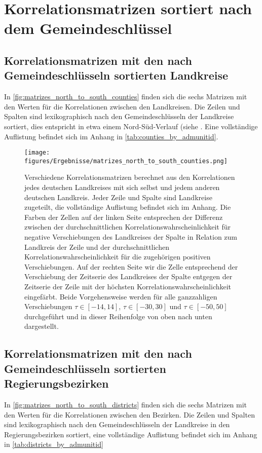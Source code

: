 \section{Korrelationsmatrizen sortiert nach dem Gemeindeschlüssel}
\subsection{Korrelationsmatrizen mit den nach Gemeindeschlüsseln sortierten Landkreise}
In \autoref{fig:matrizes_north_to_south_counties} finden sich die sechs Matrizen mit den Werten für die Korrelationen zwischen den Landkreisen.
Die Zeilen und Spalten sind lexikographisch nach den Gemeindeschlüsseln der Landkreise sortiert, dies entspricht in etwa einem Nord-Süd-Verlauf (siehe . Eine vollständige Auflistung befindet sich im Anhang in \autoref{tab:counties_by_admunitid}.

\begin{figure}[H]
    \centering
    \texttt{[image: figures/Ergebnisse/matrizes\_north\_to\_south\_counties.png]}
    \caption{Verschiedene Korrelationsmatrizen berechnet aus den Korrelationen jedes deutschen Landkreises mit sich selbst und jedem anderen deutschen Landkreis. Jeder Zeile und Spalte sind Landkreise zugeteilt, die vollständige Auflistung befindet sich im Anhang. Die Farben der Zellen auf der linken Seite entsprechen der Differenz zwischen der durchschnittlichen Korrelationswahrscheinlichkeit für negative Verschiebungen des Landkreises der Spalte in Relation zum Landkreis der Zeile und der durchschnittlichen Korrelationswahrscheinlichkeit für die zugehörigen positiven Verschiebungen.
    Auf der rechten Seite wir die Zelle entsprechend der Verschiebung der Zeitserie des Landkreises der Spalte entgegen der Zeitserie der Zeile mit der höchsten Korrelationswahrscheinlichkeit eingefärbt. Beide Vorgehensweise werden für alle ganzzahligen Verschiebungen $\tau\in[-14,14]$,  $\tau\in[-30,30]$ und  $\tau\in[-50,50]$ durchgeführt und in dieser Reihenfolge von oben nach unten dargestellt.}
    \label{fig:matrizes_north_to_south_counties}
\end{figure}


\subsection{Korrelationsmatrizen mit den nach Gemeindeschlüsseln sortierten Regierungsbezirken}
In \autoref{fig:matrizes_north_to_south_districts} finden sich die sechs Matrizen mit den Werten für die Korrelationen zwischen den Bezirken. Die Zeilen und Spalten sind lexikographisch nach den Gemeindeschlüsseln der Landkreise in den Regierungsbezirken sortiert, eine vollständige Auflistung befindet sich im Anhang in \autoref{tab:districts_by_admunitid}

